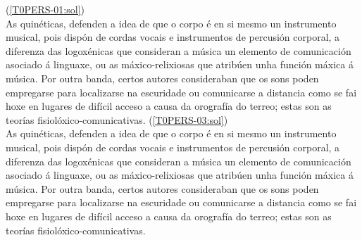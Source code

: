 %
    {%
    (\ref{T0PERS-01:sol}) {\color{orange}{\hrulefill}}
    \\ \small{%
    As quinéticas, defenden a idea de que o corpo é en si mesmo un instrumento musical, pois dispón de cordas vocais e instrumentos de percusión corporal, a diferenza das logoxénicas que consideran a música un elemento de comunicación asociado á linguaxe, ou as máxico-relixiosas que atribúen unha función máxica á música. Por outra banda, certos autores consideraban que os sons poden empregarse para localizarse na escuridade ou comunicarse a distancia como se fai hoxe en lugares de difícil acceso a causa da orografía do terreo; estas son as teorías fisiolóxico-comunicativas.
    {\color{orange}{\hrulefill}}
    }
    }
%
%
    {%
    (\ref{T0PERS-03:sol}) {\color{orange}{\hrulefill}}
    \\ \small{%
    As quinéticas, defenden a idea de que o corpo é en si mesmo un instrumento musical, pois dispón de cordas vocais e instrumentos de percusión corporal, a diferenza das logoxénicas que consideran a música un elemento de comunicación asociado á linguaxe, ou as máxico-relixiosas que atribúen unha función máxica á música. Por outra banda, certos autores consideraban que os sons poden empregarse para localizarse na escuridade ou comunicarse a distancia como se fai hoxe en lugares de difícil acceso a causa da orografía do terreo; estas son as teorías fisiolóxico-comunicativas.
    {\color{orange}{\hrulefill}}
    }
    }
%
